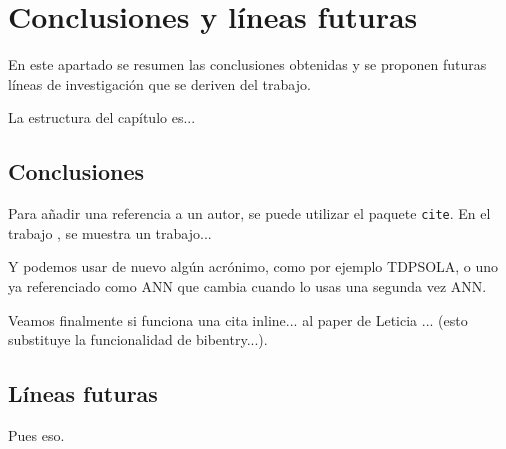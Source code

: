 %
%
%
% 
%
%
%
%

\chapter{Conclusiones y líneas futuras}
\label{cha:concl-y-line}

En este apartado se resumen las conclusiones obtenidas y se proponen futuras líneas de investigación que se deriven del trabajo.

La estructura del capítulo es...


\section{Conclusiones}
\label{sec:conclusiones}

Para añadir una referencia a un autor, se puede utilizar el paquete \texttt{cite}. En el trabajo \cite{armani03}, se muestra un trabajo...

Y podemos usar de nuevo algún acrónimo, como por ejemplo \ac{TDPSOLA}, o uno ya referenciado como \ac{ANN} que cambia cuando lo usas una segunda vez \ac{ANN}.

Veamos finalmente si funciona una cita inline... al paper de Leticia ... (esto substituye la funcionalidad de bibentry...).


\section{Líneas futuras}
\label{sec:lineas-futuras}

Pues eso.




